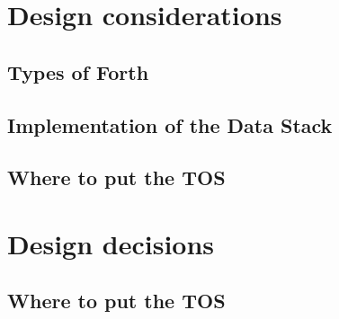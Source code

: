 
\section{Design considerations}

\subsection{Types of Forth}
\subsection{Implementation of the Data Stack}
\subsection{Where to put the TOS}

\section{Design decisions}
\subsection{Where to put the TOS}

